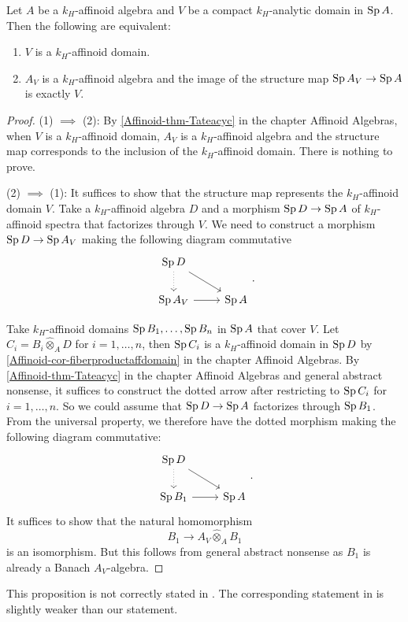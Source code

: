 \begin{proposition}\label{prop-compactanalydomainaffinoid}
    Let $A$ be a $k_H$-affinoid algebra and $V$ be a compact $k_H$-analytic domain in $\operatorname{Sp} A$. Then the following are equivalent:
    \begin{enumerate}
        \item $V$ is a $k_H$-affinoid domain.
        \item $A_V$ is a $k_H$-affinoid algebra and the image of the structure map $\operatorname{Sp} A_V\rightarrow \operatorname{Sp} A$ is exactly $V$.
    \end{enumerate}
\end{proposition}
\begin{proof}
    (1) $\implies$ (2): By \cref{Affinoid-thm-Tateacyc} in the chapter Affinoid Algebras, when $V$ is a $k_H$-affinoid domain, $A_V$ is a $k_H$-affinoid algebra and the structure map corresponds to the inclusion of the $k_H$-affinoid domain. There is nothing to prove.

    (2) $\implies$ (1): It suffices to show that the structure map represents the $k_H$-affinoid domain $V$. Take a $k_H$-affinoid algebra $D$ and a morphism $\operatorname{Sp} D\rightarrow \operatorname{Sp} A$ of $k_H$-affinoid spectra that factorizes through $V$. We need to construct a morphism $\operatorname{Sp} D\rightarrow \operatorname{Sp} A_V$ making the following diagram commutative
    \[
        \begin{tikzcd}
            \Sp D \arrow[rd] \arrow[d, dotted] &       \\
            \Sp A_V \arrow[r]                  & \Sp A
        \end{tikzcd}.    
    \]
    
    Take $k_H$-affinoid domains $\operatorname{Sp} B_1,\ldots,\operatorname{Sp} B_n$ in $\operatorname{Sp} A$ that cover $V$. Let $C_i=B_i\hat{\otimes}_A D$ for $i=1,\ldots,n$, then $\operatorname{Sp} C_i$ is a $k_H$-affinoid domain in $\operatorname{Sp} D$ by \cref{Affinoid-cor-fiberproductaffdomain} in the chapter Affinoid Algebras. By \cref{Affinoid-thm-Tateacyc} in the chapter Affinoid Algebras and general abstract nonsense, it suffices to construct the dotted arrow after restricting to $\operatorname{Sp} C_i$ for $i=1,\ldots,n$. So we could assume that $\operatorname{Sp} D\rightarrow \operatorname{Sp} A$ factorizes through $\operatorname{Sp} B_1$. From the universal property, we therefore have the dotted morphism making the following diagram commutative:
    \[
        \begin{tikzcd}
            \Sp D \arrow[rd] \arrow[d, dotted] &       \\
            \Sp B_1 \arrow[r]                  & \Sp A
        \end{tikzcd}.    
    \]
    It suffices to show that the natural homomorphism
    \[
        B_1\rightarrow A_V\hat{\otimes}_A B_1  
    \]
    is an isomorphism. But this follows from general abstract nonsense as $B_1$ is already a Banach $A_V$-algebra.
\end{proof}
\begin{remark}
    This proposition is not correctly stated in \cite[Corollary~2.2.6]{Berk12}. The corresponding statement in \cite[Remark~1.2.1]{Berk93} is slightly weaker than our statement.
\end{remark}



